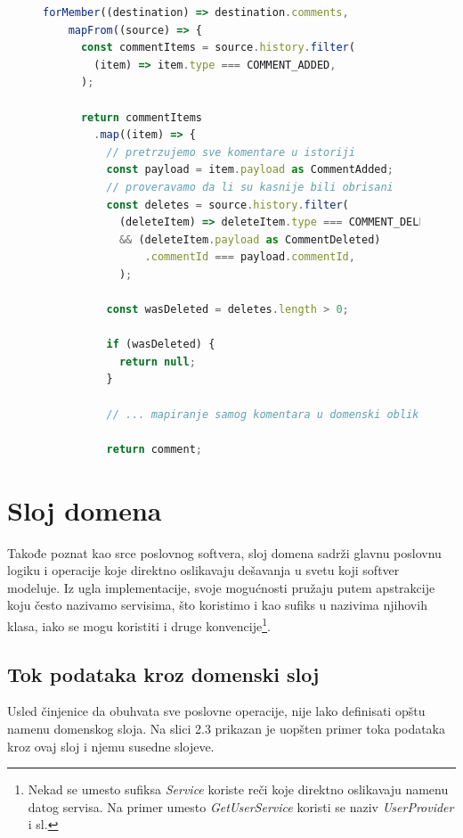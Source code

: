 \documentclass[12pt,oneside]{memoir}
\begin{document}
\begin{figure}[h]
\begin{lstlisting}[language=JavaScript, style=ES6, caption={Mapiranje komentara tiketa}]
  forMember((destination) => destination.comments,
    mapFrom((source) => {
      const commentItems = source.history.filter(
        (item) => item.type === COMMENT_ADDED,
      );

      return commentItems
        .map((item) => {
          // pretrzujemo sve komentare u istoriji
          const payload = item.payload as CommentAdded;
          // proveravamo da li su kasnije bili obrisani
          const deletes = source.history.filter(
            (deleteItem) => deleteItem.type === COMMENT_DELETED 
            && (deleteItem.payload as CommentDeleted)
                .commentId === payload.commentId,
            );
          
          const wasDeleted = deletes.length > 0;

          if (wasDeleted) {
            return null;
          }

          // ... mapiranje samog komentara u domenski oblik...

          return comment;

\end{lstlisting}
\end{figure}




\newpage
\section{Sloj domena}

Takođe poznat kao srce poslovnog softvera, sloj domena sadrži glavnu poslovnu logiku i operacije koje direktno oslikavaju dešavanja u svetu koji softver modeluje. Iz ugla implementacije, svoje mogućnosti pružaju putem apstrakcije koju često nazivamo servisima, što koristimo i kao sufiks u nazivima njihovih klasa, iako se mogu koristiti i druge konvencije\footnote{Nekad se umesto sufiksa \textit{Service} koriste reči koje direktno oslikavaju namenu datog servisa. Na primer umesto \textit{GetUserService} koristi se naziv \textit{UserProvider} i sl.}.

\subsection{Tok podataka kroz domenski sloj}

Usled činjenice da obuhvata sve poslovne operacije, nije lako definisati opštu namenu domenskog sloja. Na slici 2.3 prikazan je uopšten primer toka podataka kroz ovaj sloj i njemu susedne slojeve.
\end{document}

